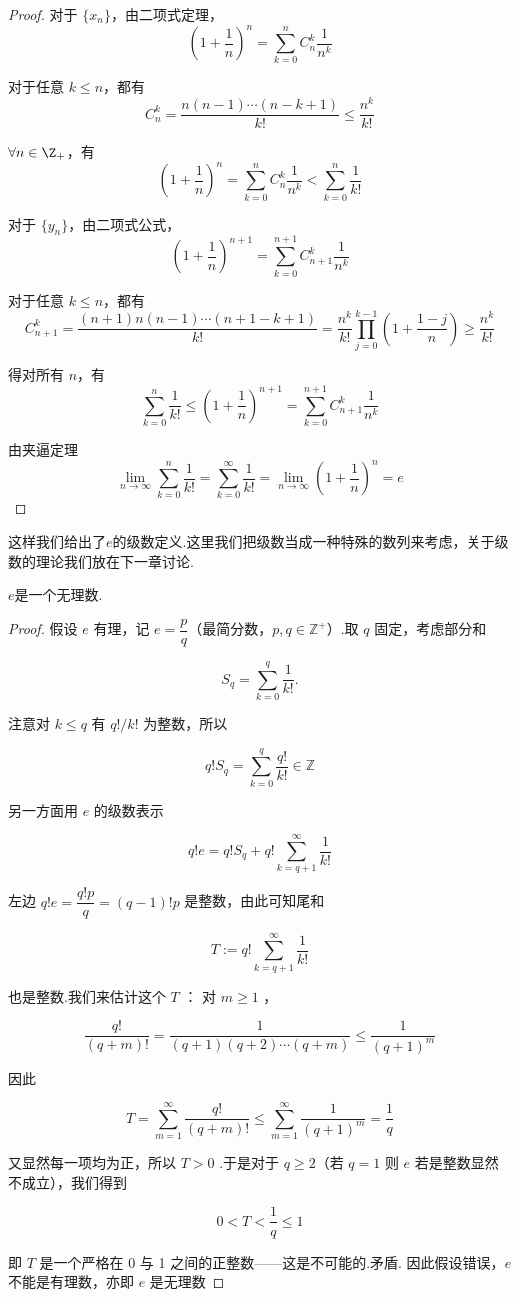 \begin{proof}
	对于 $\{x_n\}$，由二项式定理，
	\[
	\left(1 + \frac{1}{n}\right)^n = \sum_{k=0}^n C_n^k \frac{1}{n^k}
	\]
	
	对于任意 $k \leqslant n$，都有
	\[
	C_n^k = \frac{n(n-1)\cdots(n-k+1)}{k!} \leqslant \frac{n^k}{k!}
	\]
	
	$\forall n \in\Z_{+}$，有
	\[
	\left(1 + \frac{1}{n}\right)^n = \sum_{k=0}^n C_n^k \frac{1}{n^k} < \sum_{k=0}^n \frac{1}{k!}
	\]
	
	对于 $\{y_n\}$，由二项式公式，
	\[
	\left(1 + \frac{1}{n}\right)^{n+1} = \sum_{k=0}^{n+1} C_{n+1}^k \frac{1}{n^k}
	\]
	
	对于任意 $k \leqslant n$，都有
	\[
	C_{n+1}^k = \frac{(n+1)n(n-1)\cdots(n+1-k+1)}{k!} = \frac{n^k}{k!} \prod_{j=0}^{k-1} \left(1 + \frac{1 - j}{n}\right) \geqslant \frac{n^k}{k!}
	\]
	
	得对所有 $n$，有
	\[
	\sum_{k=0}^n \frac{1}{k!} \leqslant \left(1 + \frac{1}{n}\right)^{n+1} = \sum_{k=0}^{n+1} C_{n+1}^k \frac{1}{n^k}
	\]
	
	由夹逼定理
	\[
	\lim_{n \to \infty} \sum_{k=0}^n \frac{1}{k!} = \sum_{k=0}^\infty \frac{1}{k!} =\lim\limits_{n \to \infty}(1+\frac{1}{n})^n= e
	\]
\end{proof}
这样我们给出了$e$的级数定义.这里我们把级数当成一种特殊的数列来考虑，关于级数的理论我们放在下一章讨论.
\begin{theorem}
	$e$是一个无理数.
\end{theorem}
\begin{proof}
	假设 $e$ 有理，记 $e=\dfrac{p}{q}$（最简分数，$p, q \in \mathbb{Z}^{+}$）.取 $q$ 固定，考虑部分和
	
	$$
	S_q=\sum_{k=0}^q \frac{1}{k!} .
	$$
	
	
	注意对 $k \leqslant q$ 有 $q!/ k!$ 为整数，所以
	
	$$
	q!S_q=\sum_{k=0}^q \frac{q!}{k!} \in \mathbb{Z}
	$$
	
	
	另一方面用 $e$ 的级数表示
	
	$$
	q!e=q!S_q+q!\sum_{k=q+1}^{\infty} \frac{1}{k!}
	$$
	
	
	左边 $q!e=\dfrac{q!p}{q}=(q-1)!p$ 是整数，由此可知尾和
	
	$$
	T:=q!\sum_{k=q+1}^{\infty} \frac{1}{k!}
	$$
	
	
	也是整数.我们来估计这个 $T$ ：
	对 $m \geqslant 1$ ，
	
	$$
	\frac{q!}{(q+m)!}=\frac{1}{(q+1)(q+2) \cdots(q+m)} \leqslant \frac{1}{(q+1)^m}
	$$
	
	
	因此
	
	$$
	T=\sum_{m=1}^{\infty} \frac{q!}{(q+m)!} \leqslant \sum_{m=1}^{\infty} \frac{1}{(q+1)^m}=\frac{1}{q}
	$$
	
	
	又显然每一项均为正，所以 $T>0$ .于是对于 $q \geqslant 2$（若 $q=1$ 则 $e$ 若是整数显然不成立），我们得到
	
	$$
	0<T<\frac{1}{q} \leqslant 1
	$$
	
	
	即 $T$ 是一个严格在 0 与 1 之间的正整数——这是不可能的.矛盾.
	因此假设错误，$e$ 不能是有理数，亦即 $e$ 是无理数
	
\end{proof}

